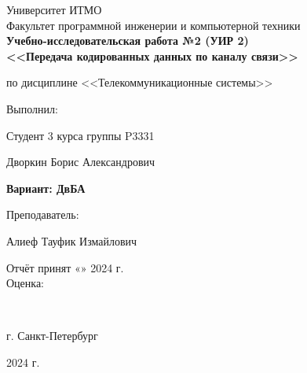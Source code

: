 \begin{center}
	\vspace{1cm}
	\large{Университет ИТМО}\\
	\large{Факультет программной инженерии и компьютерной техники}\\
	\vspace{4cm}
	\Large{\textbf{Учебно-исследовательская работа №2 (УИР 2)\\}}
	\vspace{0.3cm}
	\large{\textbf{<<Передача кодированных данных по каналу связи>>\\}}
	\vspace{-0.3cm}
	\begin{center}
		\large{по дисциплине <<Телекоммуникационные системы>>}
	\end{center}
	\vspace{3cm}
\end{center}
\normalsize{
	\begin{flushright}
		Выполнил:
		\par
		Студент 3 курса группы P3331
		\par
		Дворкин Борис Александрович
		\par
		\textbf{Вариант: ДвБА}
		\par
		\vspace{1cm}
		Преподаватель:
		\par
		Алиеф Тауфик Измайлович
		\par
		\noindent Отчёт принят «\underline{\hspace{0.7cm}}» \underline{\hspace{1.3cm}} 2024 г.\\
		Оценка: \underline{\hspace{2cm}}
	\end{flushright}
}\\
\vspace{6cm}
\begin{center} г. Санкт-Петербург
	\par
	2024 г.
\end{center}
\thispagestyle{empty}
\thispagestyle{empty}
